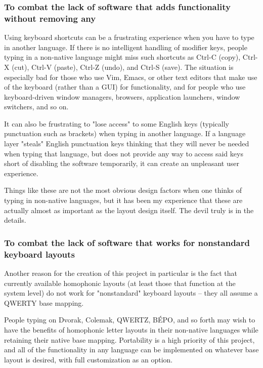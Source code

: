 \documentclass[11pt]{article}
\begin{document}
\subsubsection{To combat the lack of software that adds functionality without removing any}
\label{sec:org56a9e80}

Using keyboard shortcuts can be a frustrating experience when you have to type in another language. If there is no intelligent handling of modifier keys, people typing in a non-native language might miss such shortcuts as Ctrl-C (copy), Ctrl-X (cut), Ctrl-V (paste), Ctrl-Z (undo), and Ctrl-S (save). The situation is especially bad for those who use Vim, Emacs, or other text editors that make use of the keyboard (rather than a GUI) for functionality, and for people who use keyboard-driven window managers, browsers, application launchers, window switchers, and so on.

It can also be frustrating to "lose access" to some English keys (typically punctuation such as brackets) when typing in another language. If a language layer "steals" English punctuation keys thinking that they will never be needed when typing that language, but does not provide any way to access said keys short of disabling the software temporarily, it can create an unpleasant user experience.

Things like these are not the most obvious design factors when one thinks of typing in non-native languages, but it has been my experience that these are actually almost as important as the layout design itself. The devil truly is in the details.

\subsubsection{To combat the lack of software that works for nonstandard keyboard layouts}
\label{sec:orgf0f083f}

Another reason for the creation of this project in particular is the fact that currently available homophonic layouts (at least those that function at the system level) do not work for "nonstandard" keyboard layouts -- they all assume a QWERTY base mapping.

People typing on Dvorak, Colemak, QWERTZ, BÉPO, and so forth may wish to have the benefits of homophonic letter layouts in their non-native languages while retaining their native base mapping. Portability is a high priority of this project, and all of the functionality in any language can be implemented on whatever base layout is desired, with full customization as an option.
\end{document}
